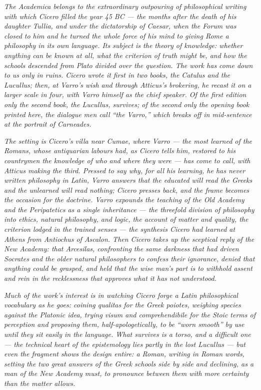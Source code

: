 
\textit{The \textit{Academica} belongs to the extraordinary outpouring
of philosophical writing with which Cicero filled the year 45 BC ---
the months after the death of his daughter Tullia, and under the
dictatorship of Caesar, when the Forum was closed to him and he turned
the whole force of his mind to giving Rome a philosophy in its own
language. Its subject is the theory of knowledge: whether anything can
be known at all, what the criterion of truth might be, and how the
schools descended from Plato divided over the question. The work has
come down to us only in ruins. Cicero wrote it first in two books, the
\textit{Catulus} and the \textit{Lucullus}; then, at Varro's wish and
through Atticus's brokering, he recast it on a larger scale in four,
with Varro himself as the chief speaker. Of the first edition only the
second book, the \textit{Lucullus}, survives; of the second only the
opening book printed here, the dialogue men call ``the Varro,'' which
breaks off in mid-sentence at the portrait of Carneades.}

\textit{The setting is Cicero's villa near Cumae, where Varro --- the
most learned of the Romans, whose antiquarian labours had, as Cicero
tells him, restored to his countrymen the knowledge of who and where
they were --- has come to call, with Atticus making the third. Pressed
to say why, for all his learning, he has never written philosophy in
Latin, Varro answers that the educated will read the Greeks and the
unlearned will read nothing; Cicero presses back, and the frame becomes
the occasion for the doctrine. Varro expounds the teaching of the Old
Academy and the Peripatetics as a single inheritance --- the threefold
division of philosophy into ethics, natural philosophy, and logic, the
account of matter and quality, the criterion lodged in the trained
senses --- the synthesis Cicero had learned at Athens from Antiochus of
Ascalon. Then Cicero takes up the sceptical reply of the New Academy:
that Arcesilas, confronting the same darkness that had driven Socrates
and the older natural philosophers to confess their ignorance, denied
that anything could be grasped, and held that the wise man's part is to
withhold assent and rein in the recklessness that approves what it has
not understood.}

\textit{Much of the work's interest is in watching Cicero forge a Latin
philosophical vocabulary as he goes: coining \textit{qualitas} for the
Greek \textit{poiotes}, weighing \textit{species} against the Platonic
\textit{idea}, trying \textit{visum} and \textit{comprehendibile} for
the Stoic terms of perception and proposing them, half-apologetically,
to be ``worn smooth'' by use until they sit easily in the language.
What survives is a torso, and a difficult one --- the technical heart
of the epistemology lies partly in the lost \textit{Lucullus} --- but
even the fragment shows the design entire: a Roman, writing in Roman
words, setting the two great answers of the Greek schools side by side
and declining, as a man of the New Academy must, to pronounce between
them with more certainty than the matter allows.}
